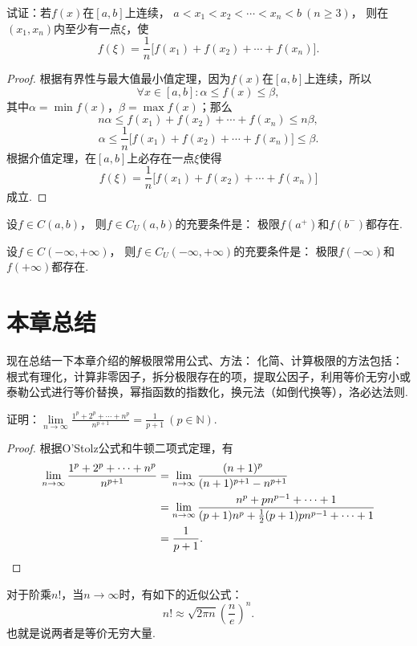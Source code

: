 \begin{example}
试证：若\(f(x)\)在\([a,b]\)上连续，
\(a < x_1 < x_2 < \dotsb < x_n < b \ (n \geq 3)\)，
则在\((x_1,x_n)\)内至少有一点\(\xi\)，使\[
f(\xi) = \frac{1}{n} \bigl[
	f(x_1) + f(x_2) + \dotsb + f(x_n)
\bigr].
\]
\begin{proof}
根据有界性与最大值最小值定理，因为\(f(x)\)在\([a,b]\)上连续，所以\[
\forall x \in [a,b] :
	\alpha \leq f(x) \leq \beta,
\]其中\(\alpha = \min f(x)\)，\(\beta = \max f(x)\)；那么\[
n \alpha \leq f(x_1) + f(x_2) + \dotsb + f(x_n) \leq n \beta,
\]\[
\alpha \leq \frac{1}{n} \bigl[f(x_1) + f(x_2) + \dotsb + f(x_n)\bigr] \leq \beta.
\]根据介值定理，在\([a,b]\)上必存在一点\(\xi\)使得\[
f(\xi) = \frac{1}{n} \bigl[ f(x_1) + f(x_2) + \dotsb + f(x_n) \bigr]
\]成立.
\end{proof}
\end{example}

\begin{theorem}\label{theorem:极限.闭区间上连续函数的性质.开区间上的连续函数一致连续的充要条件1}
设\(f \in C(a,b)\)，
则\(f \in C_U(a,b)\)的充要条件是：
极限\(f(a^+)\)和\(f(b^-)\)都存在.
\end{theorem}

\begin{theorem}\label{theorem:极限.闭区间上连续函数的性质.开区间上的连续函数一致连续的充要条件2}
设\(f \in C(-\infty,+\infty)\)，
则\(f \in C_U(-\infty,+\infty)\)的充要条件是：
极限\(f(-\infty)\)和\(f(+\infty)\)都存在.
\end{theorem}

\section{本章总结}
现在总结一下本章介绍的解极限常用公式、方法：
化简、计算极限的方法包括：根式有理化，计算非零因子，拆分极限存在的项，提取公因子，利用等价无穷小或泰勒公式进行等价替换，幂指函数的指数化，换元法（如倒代换等），洛必达法则.

\begin{example}\label{example:极限.解极限常用公式方法.例1}
证明：\(\lim\limits_{n\to\infty} \frac{1^p+2^p+\dotsb+n^p}{n^{p+1}} = \frac{1}{p+1}\ (p\in\mathbb{N})\).
\begin{proof}
根据O'Stolz公式和牛顿二项式定理，有\begin{align*}
\lim\limits_{n\to\infty} \frac{1^p+2^p+\dotsb+n^p}{n^{p+1}}
&= \lim\limits_{n\to\infty} \frac{(n+1)^p}{(n+1)^{p+1} - n^{p+1}} \\
&= \lim\limits_{n\to\infty} \frac{n^p + p n^{p-1} + \dotsb + 1}{(p+1) n^p + \frac{1}{2} (p+1) p n^{p-1} + \dotsb + 1} \\
&= \frac{1}{p+1}.
\qedhere
\end{align*}
\end{proof}
\end{example}

\begin{theorem}[斯特林公式]\label{theorem:极限.斯特林公式}
对于阶乘\(n!\)，当\(n\to\infty\)时，有如下的近似公式：\[
n! \approx \sqrt{2 \pi n} \left( \frac{n}{e} \right)^n.
\]也就是说两者是等价无穷大量.
\end{theorem}
